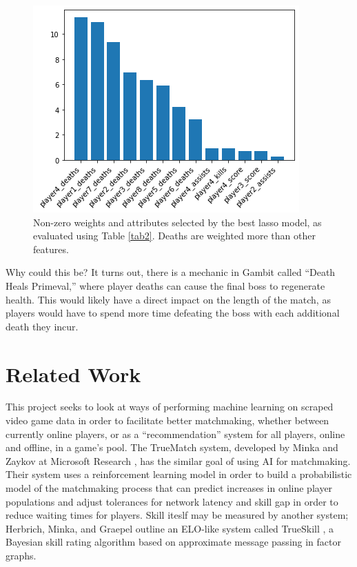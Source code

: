\documentclass[conference]{IEEEtran}
\begin{document}
\begin{figure}[htbp]
    \centerline{
        \includegraphics[width=0.75\columnwidth]{figs/lasso-model-weights.png}
    }
    \caption{Non-zero weights and attributes selected by the best lasso
        model, as evaluated using Table \ref{tab2}. Deaths are weighted more than
        other features.}
    \label{lasso}
\end{figure}

Why could this be? It turns out, there is a mechanic in Gambit called ``Death
Heals Primeval,'' where player deaths can cause the final boss to regenerate
health. This would likely have a direct impact on the length of the match, as
players would have to spend more time defeating the boss with each additional
death they incur.

\section{Related Work}\label{RW}

This project seeks to look at ways of performing machine learning on scraped
video game data in order to facilitate better matchmaking, whether between
currently online players, or as a ``recommendation'' system for all players,
online and offline, in a game's pool. The TrueMatch system, developed by Minka
and Zaykov at Microsoft Research \cite{truematch}, has the similar goal
of using AI for matchmaking. Their system uses a reinforcement learning model
in order to build a probabilistic model of the matchmaking process that can
predict increases in online player populations and adjust tolerances for
network latency and skill gap in order to reduce waiting times for players.
Skill iteslf may be measured by another system; Herbrich, Minka, and Graepel
outline an ELO-like system called TrueSkill \cite{trueskill}, a Bayesian
skill rating algorithm based on approximate message passing in factor graphs.
\end{document}
